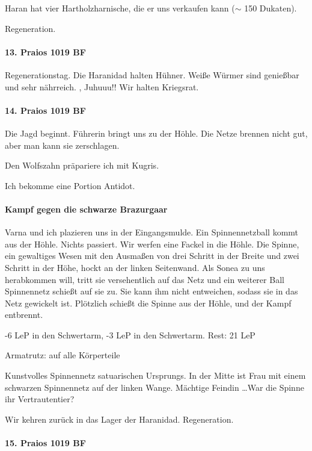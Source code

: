 Haran hat vier Hartholzharnische, die er uns verkaufen kann ($\sim$ 150 Dukaten). 

 Regeneration. 

\paragraph{13. Praios 1019 BF}
\label{sec:13.-praios-1019}
Regenerationstag. Die Haranidad halten Hühner. 
Weiße Würmer sind genießbar und sehr nährreich. ,  Juhuuu!! Wir halten Kriegsrat. 

\paragraph{14. Praios 1019 BF}
\label{sec:14.-praios-1019}
Die Jagd beginnt. Führerin  bringt uns zu der Höhle. Die Netze brennen nicht gut, aber man kann sie zerschlagen. 

Den Wolfszahn präpariere ich mit Kugris. 

Ich bekomme eine Portion Antidot. 

\paragraph{Kampf gegen die schwarze Brazurgaar}
 Varna und ich plazieren uns in der Eingangsmulde. Ein Spinnennetzball kommt aus der Höhle. Nichts passiert. Wir werfen eine Fackel in die Höhle. Die Spinne, ein gewaltiges Wesen mit den Ausmaßen von drei Schritt in der Breite und zwei Schritt in der Höhe, hockt an der linken Seitenwand. Als Sonea zu uns herabkommen will, tritt sie versehentlich auf das Netz und ein weiterer Ball Spinnennetz schießt auf sie zu. Sie kann ihm nicht entweichen, sodass sie in das Netz gewickelt ist. Plötzlich schießt die Spinne aus der Höhle, und der Kampf entbrennt.  

-6 LeP in den Schwertarm, -3 LeP in den Schwertarm. 
Rest: 21 LeP

Armatrutz:  auf alle Körperteile

Kunstvolles Spinnennetz satuarischen Ursprungs. In der Mitte ist Frau mit einem schwarzen Spinnennetz auf der linken Wange. Mächtige Feindin \dots War die Spinne ihr Vertrautentier?

Wir kehren zurück in das Lager der Haranidad. 
 Regeneration. 

\paragraph{15. Praios 1019 BF}
\label{sec:15.-praios-1019}

